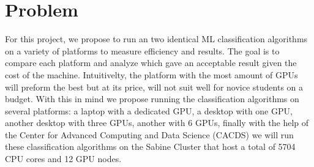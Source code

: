 \section*{Problem}
\label{sec:Problem}

For this project, we propose to run an two identical ML classification algorithms on a 
variety of platforms to measure efficiency and results. The goal is to compare each platform 
and analyze which gave an acceptable result given the cost of the machine. Intuitivelty, the 
platform with the most amount of GPUs will preform the best but at its price, will not suit 
well for novice students on a budget. With this in mind we propose running the classification 
algorithms on several platforms: a laptop with a dedicated GPU, a desktop with one GPU, another 
desktop with three GPUs, another with 6 GPUs, finally with the help of the Center for Advanced 
Computing and Data Science (CACDS) we will run these classification algorithms on the Sabine
Cluster that host a total of 5704 CPU cores and 12 GPU nodes.

